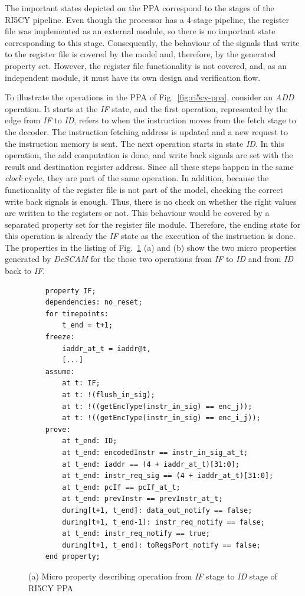 The important states depicted on the PPA correspond to the stages of the RI5CY pipeline. Even though the processor has a 4-stage pipeline, the register file was implemented as an external module, so there is no important state corresponding to this stage. Consequently, the behaviour of the signals that write to the register file is covered by the model and, therefore, by the generated property set. However, the register file functionality is not covered, and, as an independent module, it must have its own design and verification flow.

To illustrate the operations in the PPA of Fig.~\ref{fig:ri5cy-ppa}, consider an \textit{ADD} operation. It starts at the \textit{IF} state, and the first operation, represented by the edge from \textit{IF} to \textit{ID}, refers to when the instruction moves from the fetch stage to the decoder. The instruction fetching address is updated and a new request to the instruction memory is sent. The next operation starts in state \textit{ID}. In this operation, the add computation is done, and write back signals are set with the result and destination register address. Since all these steps happen in the same \textit{clock} cycle, they are part of the same operation. In addition, because the functionality of the register file is not part of the model, checking the correct write back signals is enough. Thus, there is no check on whether the right values are written to the registers or not. This behaviour would be covered by a separated property set for the register file module. Therefore, the ending state for this operation is already the \textit{IF} state as the execution of the instruction is done. The properties in the listing of Fig.~\ref{fig:ri5cy-if-id-micro-ppt-a} (a) and (b) show the two micro properties generated by \textit{DeSCAM} for the those two operations from \textit{IF} to \textit{ID} and from \textit{ID} back to \textit{IF}.

\begin{figure}[htb]
    \begin{lstlisting}
    property IF;
    dependencies: no_reset;
    for timepoints:
        t_end = t+1;
    freeze:
        iaddr_at_t = iaddr@t,
        [...]
    assume:
        at t: IF;
        at t: !(flush_in_sig);
        at t: !((getEncType(instr_in_sig) == enc_j));
        at t: !((getEncType(instr_in_sig) == enc_i_j));
    prove:
        at t_end: ID;
        at t_end: encodedInstr == instr_in_sig_at_t;
        at t_end: iaddr == (4 + iaddr_at_t)[31:0];
        at t_end: instr_req_sig == (4 + iaddr_at_t)[31:0];
        at t_end: pcIf == pcIf_at_t;
        at t_end: prevInstr == prevInstr_at_t;
        during[t+1, t_end]: data_out_notify == false;
        during[t+1, t_end-1]: instr_req_notify == false;
        at t_end: instr_req_notify == true;
        during[t+1, t_end]: toRegsPort_notify == false;
    end property;\end{lstlisting}
    \caption{(a) Micro property describing operation from \textit{IF} stage to \textit{ID} stage of RI5CY PPA}
    \label{fig:ri5cy-if-id-micro-ppt-a}
\end{figure}

